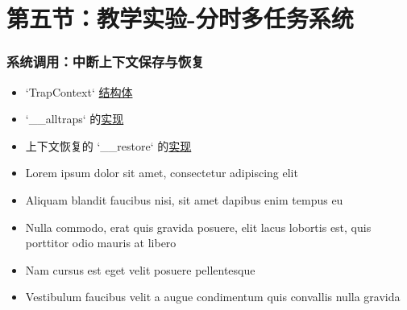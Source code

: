 \section{第五节：教学实验-分时多任务系统}%
\begin{frame}
	\frametitle{系统调用：中断上下文保存与恢复}
	\begin{itemize}
		\item  `TrapContext` \href{https://github.com/rcore-os/rCore-Tutorial-v3/blob/ch3-coop/os/src/trap/context.rs#L4}{结构体}
		\item  `__alltraps` 的\href{https://github.com/rcore-os/rCore-Tutorial-v3/blob/ch3-coop/os/src/trap/trap.S#L12}{实现}
		\item 上下文恢复的 `__restore` 的\href{https://github.com/rcore-os/rCore-Tutorial-v3/blob/ch3-coop/os/src/trap/trap.S#L40}{实现}

	\item 
	Lorem ipsum dolor sit amet, consectetur adipiscing elit
	\item Aliquam blandit faucibus nisi, sit amet dapibus enim tempus eu
	\item Nulla commodo, erat quis gravida posuere, elit lacus lobortis est, quis porttitor odio mauris at libero
	\item Nam cursus est eget velit posuere pellentesque
	\item Vestibulum faucibus velit a augue condimentum quis convallis nulla gravida
	\end{itemize}
\end{frame}
	
